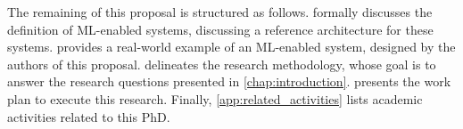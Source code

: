   The remaining of this proposal is structured as follows.
     formally discusses the definition
    of ML-enabled systems, discussing a reference architecture for
    these systems.
     provides a real-world example of
    an ML-enabled system, designed by the authors of this proposal.
     delineates the research
    methodology, whose goal is to answer the research questions
    presented in \cref{chap:introduction}.
     presents the work plan to execute
    this research.
    Finally, \cref{app:related_activities} lists academic activities
    related to this PhD.
